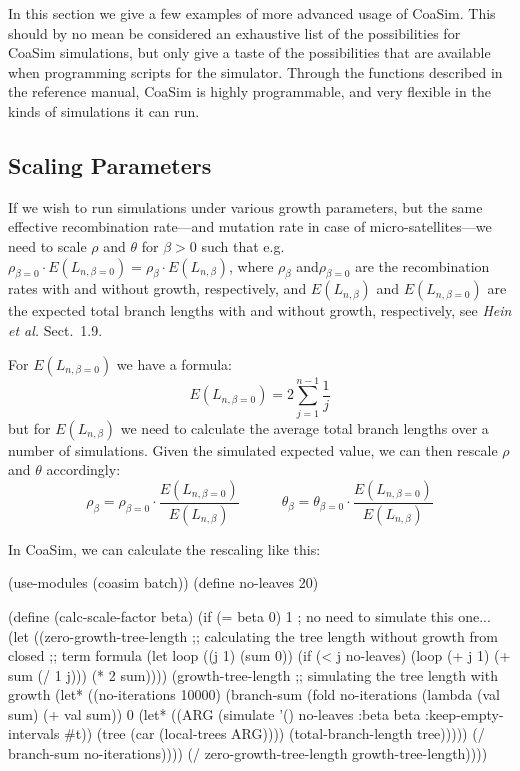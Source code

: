 \documentclass{manual}
\begin{document}
\begin{empfile}
In this section we give a few examples of more advanced usage of
CoaSim.  This should by no mean be considered an exhaustive list of
the possibilities for CoaSim simulations, but only give a taste of the
possibilities that are available when programming scripts for the
simulator.  Through the functions described in the reference manual,
CoaSim is highly programmable, and very flexible in the kinds of
simulations it can run.


\subsection{Scaling Parameters}
\label{sec:scaling-parameters}

If we wish to run simulations under various growth parameters, but the
same effective recombination rate---and mutation rate in case of
micro-satellites---we need to scale $\rho$ and $\theta$ for $\beta>0$
such that e.g.\ 
$\rho_{\beta=0}\cdot{}E(L_{n,\beta=0})=\rho_\beta\cdot{}E(L_{n,\beta})$,
where $\rho_\beta$ and$\rho_{\beta=0}$ are the recombination rates
with and without growth, respectively, and $E(L_{n,\beta})$ and
$E(L_{n,\beta=0})$ are the expected total branch lengths with and
without growth, respectively, see \emph{Hein et al.} Sect.~1.9.

For $E(L_{n,\beta=0})$ we have a formula:
\begin{equation}
  \label{eq:1}
  E(L_{n,\beta=0})=2\sum_{j=1}^{n-1}\frac{1}{j}
\end{equation}
but for $E(L_{n,\beta})$ we need to calculate the average total branch
lengths over a number of simulations.  Given the simulated expected
value, we can then rescale $\rho$ and $\theta$ accordingly: 
\[\rho_\beta=\rho_{\beta=0}\cdot\frac{E(L_{n,\beta=0})}{E(L_{n,\beta})}
  \quad\quad\quad
  \theta_\beta=\theta_{\beta=0}\cdot\frac{E(L_{n,\beta=0})}{E(L_{n,\beta})}
\]

In CoaSim, we can calculate the rescaling like this:
\begin{code}
(use-modules (coasim batch))
(define no-leaves    20)

(define (calc-scale-factor beta)
  (if (= beta 0) 1 ; no need to simulate this one...
      (let ((zero-growth-tree-length
             ;; calculating the tree length without growth from closed
             ;; term formula
             (let loop ((j 1) (sum 0))
               (if (< j no-leaves)
                   (loop (+ j 1) (+ sum (/ 1 j)))
                   (* 2 sum))))
            (growth-tree-length
             ;; simulating the tree length with growth
             (let* ((no-iterations 10000)
                    (branch-sum
                     (fold no-iterations (lambda (val sum) (+ val sum)) 0
                           (let* ((ARG (simulate '() no-leaves :beta beta
                                                 :keep-empty-intervals #t))
                                  (tree (car (local-trees ARG))))
                             (total-branch-length tree)))))
               (/ branch-sum no-iterations))))
        (/ zero-growth-tree-length growth-tree-length))))


\end{code}
\end{empfile}
\end{document}
